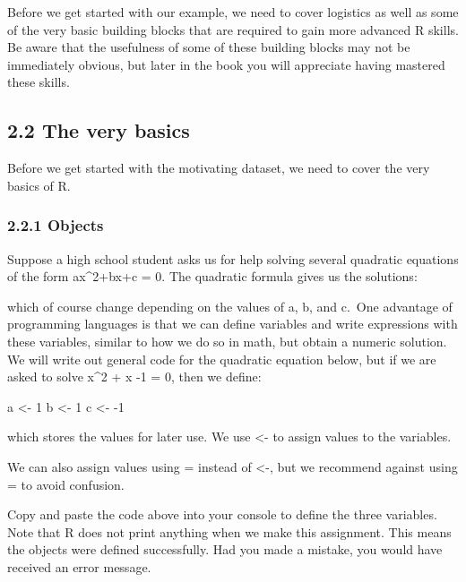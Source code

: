 \documentclass[
]{article}
\newenvironment{Shaded}{\begin{snugshade}}{\end{snugshade}}
\newcommand{\DecValTok}[1]{\textcolor[rgb]{0.00,0.00,0.81}{#1}}
\newcommand{\NormalTok}[1]{#1}
\newcommand{\OtherTok}[1]{\textcolor[rgb]{0.56,0.35,0.01}{#1}}
\newcommand{\SpecialCharTok}[1]{\textcolor[rgb]{0.00,0.00,0.00}{#1}}
\begin{document}
Before we get started with our example, we need to cover logistics as
well as some of the very basic building blocks that are required to gain
more advanced R skills. Be aware that the usefulness of some of these
building blocks may not be immediately obvious, but later in the book
you will appreciate having mastered these skills.

\hypertarget{the-very-basics}{%
\subsection{2.2 The very basics}\label{the-very-basics}}

Before we get started with the motivating dataset, we need to cover the
very basics of R.

\hypertarget{objects}{%
\subsubsection{2.2.1 Objects}\label{objects}}

Suppose a high school student asks us for help solving several quadratic
equations of the form ax\^{}2+bx+c = 0. The quadratic formula gives us
the solutions:

which of course change depending on the values of a, b, and c.~One
advantage of programming languages is that we can define variables and
write expressions with these variables, similar to how we do so in math,
but obtain a numeric solution. We will write out general code for the
quadratic equation below, but if we are asked to solve x\^{}2 + x -1 =
0, then we define:

\begin{Shaded}
\begin{Highlighting}[]
\NormalTok{a }\OtherTok{\textless{}{-}} \DecValTok{1}
\NormalTok{b }\OtherTok{\textless{}{-}} \DecValTok{1}
\NormalTok{c }\OtherTok{\textless{}{-}} \SpecialCharTok{{-}}\DecValTok{1}
\end{Highlighting}
\end{Shaded}

which stores the values for later use. We use \textless- to assign
values to the variables.

We can also assign values using = instead of \textless-, but we
recommend against using = to avoid confusion.

Copy and paste the code above into your console to define the three
variables. Note that R does not print anything when we make this
assignment. This means the objects were defined successfully. Had you
made a mistake, you would have received an error message.
\end{document}
